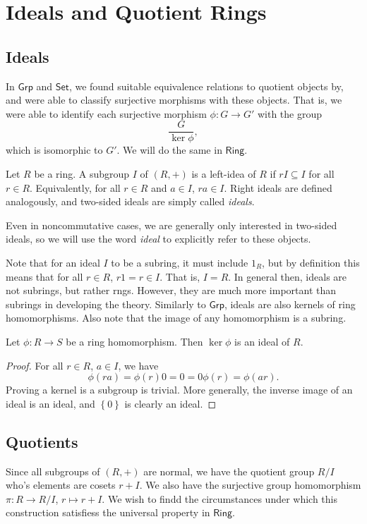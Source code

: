 \section{Ideals and Quotient Rings}
\subsection{Ideals}
In $\mathsf{Grp}$ and $\mathsf{Set}$, we found suitable equivalence relations to quotient objects by, and were able to classify surjective morphisms with these objects. That is, we were able to identify each surjective morphism $\phi : G \to G'$ with the group
\[
	\frac{G}{\ker \phi }
,\]
which is isomorphic to $G'$. We will do the same in $\mathsf{Ring}$.
\begin{definition}[Ideal]\label{dfn:3.3.1}
	Let $R$ be a ring. A subgroup $I$ of $(R,+)$ is a left-idea of $R$ if $rI\subseteq I$ for all $r\in R$. Equivalently, for all $r\in R$ and $a\in I$, $ra\in I$. Right ideals are defined analogously, and two-sided ideals are simply called \emph{ideals}.
\end{definition}

Even in noncommutative cases, we are generally only interested in two-sided ideals, so we will use the word \emph{ideal} to explicitly refer to these objects.

Note that for an ideal $I$ to be a subring, it must include $1_R$, but by definition this means that for all $r\in R$, $r1=r\in I$. That is, $I=R$. In general then, ideals are not subrings, but rather rngs. However, they are much more important than subrings in developing the theory. Similarly to  $\mathsf{Grp}$, ideals are also kernels of ring homomorphisms. Also note that the image of any homomorphism is a subring.
\begin{proposition}\label{prp:3.3.1}
	Let $\phi : R \to S$ be a ring homomorphism. Then $\ker \phi $ is an ideal of $R $.
\end{proposition}
\begin{proof}
	For all $r\in R$, $a\in I$, we have
	\[
		\phi (ra)=\phi (r)0=0=0\phi (r)=\phi (ar)
	.\]
	Proving a kernel is a subgroup is trivial. More generally, the inverse image of an ideal is an ideal, and $\left\{ 0 \right\} $ is clearly an ideal.
\end{proof}
\subsection{Quotients}
Since all subgroups of $(R,+)$ are normal, we have the quotient group $R /I$ who's elements are cosets $r+I$. We also have the surjective group homomorphism $\pi : R \to R /I$, $r\mapsto r+I$. We wish to findd the circumstances under which this construction satisfiess the universal property in $\mathsf{Ring}$.

